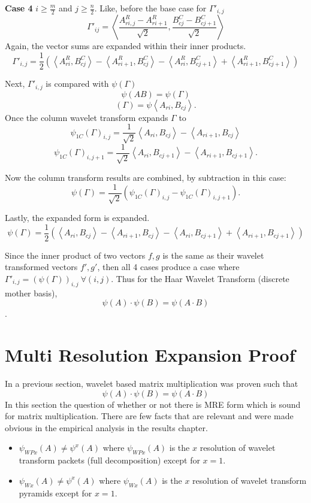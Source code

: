  \textbf{Case 4} $i \ge \frac {m}{2}$ and $j \ge \frac{n}{2}$.
Like, before the base case for $\Gamma'_{i,j}$ 
\[ \Gamma'_{ij} = \left\langle \frac {A^R_{ri,j} - A^R_{ri+1}}{\sqrt{2}} , \frac {B^C_{cj} - B^C_{cj + 1}}{\sqrt{2}} \right\rangle  \]
Again, the vector sums are expanded within their inner products. 
\[ \Gamma'_{i,j} = \frac{1}{2} ( \left\langle A^R_{ri}, B^C_{cj}   \right\rangle -   \left\langle A^R_{ri+1}, B^C_{cj}   \right\rangle -  \left\langle A^R_{ri}, B^C_{cj + 1}   \right\rangle +  \left\langle A^R_{ri+1}, B^C_{cj+1}   \right\rangle    ) \]

Next, $\Gamma'_{i,j}$ is compared with $\psi(\Gamma)$
\[ \psi (A B)  = \psi (\Gamma)    \]
\[ (\Gamma) = \psi  \left\langle A_{ri} , B_{cj}  \right\rangle . \]
Once the column wavelet transform expands $\Gamma$ to
\[ \psi_{1C} (\Gamma)_{i,j} = \frac{1}{\sqrt{2}} \left\langle A_{ri} , B_{cj}  \right\rangle - \left\langle A_{ri +1} , B_{cj}  \right\rangle   \]
\[ \psi_{1C} (\Gamma)_{i,j+1} = \frac{1}{\sqrt{2}} \left\langle A_{ri} , B_{cj+1}  \right\rangle - \left\langle A_{ri +1} , B_{cj+1}  \right\rangle. \]

Now the column transform results are combined, by subtraction in this case:
\[ \psi(\Gamma) = \frac{1}{\sqrt {2}} (\psi_{1C} (\Gamma)_{i,j} - \psi_{1C} (\Gamma)_{i,j+1}   ). \]

Lastly, the expanded form is expanded.
\[ \psi(\Gamma) = \frac{1}{2} (  \left\langle A_{ri} , B_{cj}  \right\rangle - \left\langle A_{ri +1} , B_{cj}  \right\rangle - \left\langle A_{ri} , B_{cj+1}  \right\rangle + \left\langle A_{ri +1} , B_{cj+1}  \right\rangle   ) \]

Since the inner product of two vectors $f,g$ is the same as their wavelet transformed vectors $f',g'$, then all 4 cases produce a case where $\Gamma'_{i,j} = (\psi (\Gamma))_{i,j} \ \forall (i,j)$.  Thus for the Haar Wavelet Transform (discrete mother basis), 
\[ \psi (A) \cdot \psi(B) = \psi (A\cdot B) \].

\section {Multi Resolution Expansion Proof}
In a previous section, wavelet based matrix multiplication was proven such that
\[\psi(A) \cdot \psi(B) = \psi (A\cdot B) \]
In this section the question of whether or not there is MRE form which is sound for matrix multiplication.  There are few facts that are relevant and were made obvious in the empirical analysis in the results %
chapter.  
\begin{itemize}
\item $\psi_{WPx} (A) \not= \psi^x(A) $  where $\psi_{WPx} (A) $ is the $x$ resolution of wavelet transform packets (full decomposition) except for $x=1$.
\item $\psi_{Wx} (A) \not= \psi^x(A) $  where $\psi_{Wx} (A) $ is the $x$ resolution of wavelet transform pyramids except for $x=1$.
\end{itemize}

